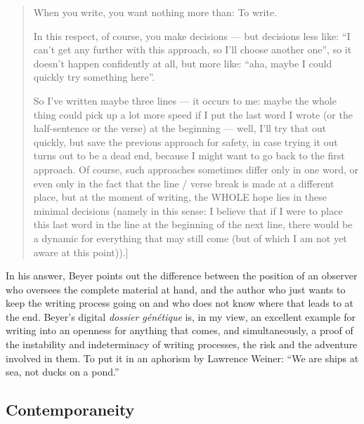 \begin{paper}
\begin{quote}
When you write, you want nothing more than: To write. 

In this respect, of course, you make decisions –– but decisions less
like: ``I can't get any further with this approach, so I'll choose
another one'', so it doesn't happen confidently at all, but more like:
``aha, maybe I could quickly try something here''.

So I've written maybe three lines –– it occurs to me: maybe the whole
thing could pick up a lot more speed if I put the last word I wrote (or
the half-sentence or the verse) at the beginning –– well, I'll try that
out quickly, but save the previous approach for safety, in case trying
it out turns out to be a dead end, because I might want to go back to
the first approach. Of course, such approaches sometimes differ only in
one word, or even only in the fact that the line / verse break is made
at a different place, but at the moment of writing, the WHOLE hope lies
in these minimal decisions (namely in this sense: I believe that if I
were to place this last word in the line at the beginning of the next
line, there would be a dynamic for everything that may still come (but
of which I am not yet aware at this point)).]

\begin{flushright}
    \parencite{beyer_e-mail_2016}
\end{flushright} 

\end{quote}

In his answer, Beyer points out the difference between the position of
an observer who oversees the complete material at hand, and the author
who just wants to keep the writing process going on and who does not
know where that leads to at the end. Beyer's digital \emph{dossier
génétique} is, in my view, an excellent example for writing into an
openness for anything that comes, and simultaneously, a proof of the
instability and indeterminacy of writing processes, the risk and the
adventure involved in them. To put it in an aphorism by Lawrence Weiner:
``We are ships at sea, not ducks on a pond.''

\subsection*{Contemporaneity}


\end{paper}
